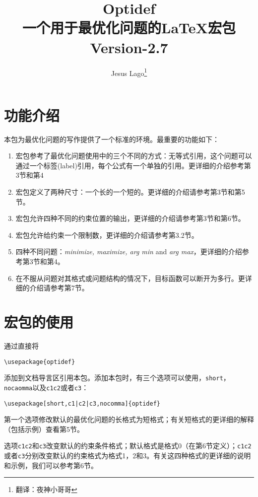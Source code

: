 \documentclass[UTF8]{ctexart}
\title{\textbf{Optidef}\\一个用于最优化问题的\LaTeX{}宏包\\Version-2.7}
\author{Jesus Lago\footnote{翻译：夜神小哥哥}}
\begin{document}
\maketitle
\newpage
\tableofcontents
\newpage
\section{功能介绍}\label{sec:intro}
本包为最优化问题的写作提供了一个标准的环境。最重要的功能如下：
\begin{enumerate}
\item 宏包参考了最优化问题使用中的三个不同的方式：无等式引用，这个问题可以通过一个标签(label)引用，每个公式有一个单独的引用。更详细的介绍参考第3节和第4
\item 宏包定义了两种尺寸：一个长的一个短的。更详细的介绍请参考第3节和第5节。
\item 宏包允许四种不同的约束位置的输出，更详细的介绍请参考第3节和第6节。
\item 宏包允许给约束一个限制数，更详细的介绍请参考第3.2节。
\item 四种不同问题：\emph{minimize, maximize, arg min} and \emph{arg max}，更详细的介绍参考第3节和第4。
\item 在不服从问题对其格式或问题结构的情况下，目标函数可以断开为多行。更详细的介绍请参考第7节。
\end{enumerate}
\section{宏包的使用}
通过直接将
\begin{verbatim}
\usepackage{optidef}
\end{verbatim}
添加到文档导言区引用本包。添加本包时，有三个选项可以使用，\texttt{short}，\texttt{nocaomma}以及\texttt{c1}\texttt{c2}或者\texttt{c3}：
\begin{verbatim}
\usepackage[short,c1|c2|c3,nocomma]{optidef}
\end{verbatim}
第一个选项修改默认的最优化问题的长格式为短格式；有关短格式的更详细的解释（包括示例）查看第5节。

选项\texttt{c1}\texttt{c2}和\texttt{c3}改变默认的约束条件格式；默认格式是格式0（在第6节定义）；\texttt{c1}\texttt{c2}或者\texttt{c3}分别改变默认的约束格式为格式1，2和3。有关这四种格式的更详细的说明和示例，我们可以参考第6节。
\end{document}
